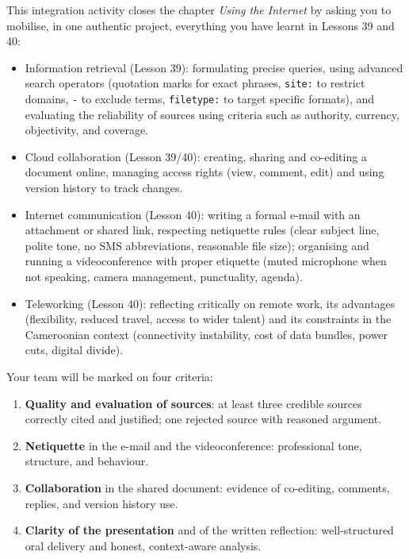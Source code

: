\documentclass[11pt]{article}
\newcommand{\cle}[1]{{\popxbold\color{popdark}#1}}
\newcounter{popsec}
\newcounter{popsub}
\newcommand{\courssub}[1]{%
  \stepcounter{popsub}%
  \par\vspace{9pt}\noindent{\popxbold\fontsize{11.5}{13}\selectfont\color{popink}{\color{poporange}\thepopsec.\thepopsub}\hspace{6pt}#1}\par\nopagebreak\vspace{4pt}
}
\begin{document}
\courssub{Aims of the activity}

This integration activity closes the chapter \emph{Using the Internet} by asking you to mobilise, in one authentic project, everything you have learnt in Lessons 39 and 40:

\begin{itemize}
\item \cle{Information retrieval} (Lesson 39): formulating precise queries, using \cle{advanced search operators} (quotation marks for exact phrases, \texttt{site:} to restrict domains, \texttt{-} to exclude terms, \texttt{filetype:} to target specific formats), and evaluating the \cle{reliability} of sources using criteria such as authority, currency, objectivity, and coverage.
\item \cle{Cloud collaboration} (Lesson 39/40): creating, sharing and co-editing a document online, managing access rights (view, comment, edit) and using version history to track changes.
\item \cle{Internet communication} (Lesson 40): writing a formal \cle{e-mail} with an attachment or shared link, respecting \cle{netiquette} rules (clear subject line, polite tone, no SMS abbreviations, reasonable file size); organising and running a \cle{videoconference} with proper etiquette (muted microphone when not speaking, camera management, punctuality, agenda).
\item \cle{Teleworking} (Lesson 40): reflecting critically on remote work, its advantages (flexibility, reduced travel, access to wider talent) and its constraints in the Cameroonian context (connectivity instability, cost of data bundles, power cuts, digital divide).
\end{itemize}

\begin{aretenir}
Your team will be marked on four criteria:
\begin{enumerate}
\item \textbf{Quality and evaluation of sources}: at least three credible sources correctly cited and justified; one rejected source with reasoned argument.
\item \textbf{Netiquette} in the e-mail and the videoconference: professional tone, structure, and behaviour.
\item \textbf{Collaboration} in the shared document: evidence of co-editing, comments, replies, and version history use.
\item \textbf{Clarity of the presentation} and of the written reflection: well-structured oral delivery and honest, context-aware analysis.
\end{enumerate}
\end{aretenir}
\end{document}
